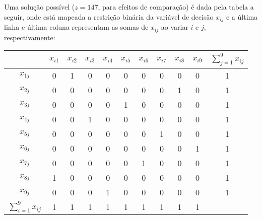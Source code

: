 \documentclass[12pt]{article}
\begin{document}
Uma solução possível ($z=147$, para efeitos de comparação) é dada pela tabela a seguir, onde está mapeada a restrição binária da variável de decisão $x_{ij}$ e a última linha e última coluna representam as somas de $x_{ij}$ ao variar $i$ e $j$, respectivamente:

\begin{table}[!h]
\centering
\begin{tabular}{|c|c|c|c|c|c|c|c|c|c|c|}
\hline
              & $x_{i1}$ & $x_{i2}$ & $x_{i3}$ & $x_{i4}$ & $x_{i5}$ & $x_{i6}$ & $x_{i7}$ & $x_{i8}$ & $x_{i9}$ & $\sum_{j=1}^{9}x_{ij}$ \\ \hline
$x_{1j}$               & 0        & 1        & 0        & 0        & 0        & 0        & 0        & 0        & 0        & 1                      \\ \hline
$x_{2j}$               & 0        & 0        & 0        & 0        & 0        & 0        & 0        & 1        & 0        & 1                      \\ \hline
$x_{3j}$               & 0        & 0        & 0        & 0        & 1        & 0        & 0        & 0        & 0        & 1                      \\ \hline
$x_{4j}$               & 0        & 0        & 1        & 0        & 0        & 0        & 0        & 0        & 0        & 1                      \\ \hline
$x_{5j}$               & 0        & 0        & 0        & 0        & 0        & 0        & 1        & 0        & 0        & 1                      \\ \hline
$x_{6j}$               & 0        & 0        & 0        & 0        & 0        & 0        & 0        & 0        & 1        & 1                      \\ \hline
$x_{7j}$               & 0        & 0        & 0        & 0        & 0        & 1        & 0        & 0        & 0        & 1                      \\ \hline
$x_{8j}$               & 1        & 0        & 0        & 0        & 0        & 0        & 0        & 0        & 0        & 1                      \\ \hline
$x_{9j}$               & 0        & 0        & 0        & 1        & 0        & 0        & 0        & 0        & 0        & 1                      \\ \hline
$\sum_{i=1}^{9}x_{ij}$ & 1        & 1        & 1        & 1        & 1        & 1        & 1        & 1        & 1        &                        \\ \hline
\end{tabular}
\end{table}
\end{document}
